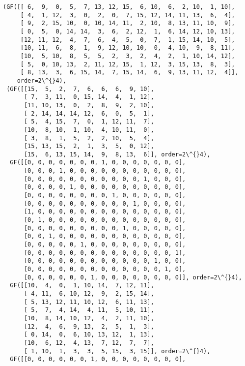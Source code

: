 \documentclass[11pt]{article}
\makeatletter
\newcommand{\boxspacing}{\kern\kvtcb@left@rule\kern\kvtcb@boxsep}
\newcommand{\prompt}[4]{
        {\ttfamily\llap{{\color{#2}[#3]:\hspace{3pt}#4}}\vspace{-\baselineskip}}
    }
\makeatother
\begin{document}
            \begin{tcolorbox}[breakable, size=fbox, boxrule=.5pt, pad at break*=1mm, opacityfill=0]
\prompt{Out}{outcolor}{3}{\boxspacing}
\begin{Verbatim}[commandchars=\\\{\}]
(GF([[ 6,  9,  0,  5,  7, 13, 12, 15,  6, 10,  6,  2, 10,  1, 10],
     [ 4,  1, 12,  3,  0,  2,  0,  7, 15, 12, 14, 11, 13,  6,  4],
     [ 9,  2, 15, 10,  0, 10, 14, 11,  2, 10,  8, 13, 11, 10,  9],
     [ 0,  5,  0, 14, 14,  3,  6,  2, 12,  1,  6, 14, 12, 10, 13],
     [12, 11, 12,  4,  7,  6,  4,  5,  0,  7,  1, 15, 14, 10,  5],
     [10, 11,  6,  8,  1,  9, 12, 10, 10,  0,  4, 10,  9,  8, 11],
     [10,  5, 10,  8,  5,  5,  2,  3,  2,  4,  2,  1, 10, 14, 12],
     [ 5,  0, 10, 13,  2, 11, 12, 15,  1, 12,  3, 15, 13,  8,  3],
     [ 8, 13,  3,  6, 15, 14,  7, 15, 14,  6,  9, 13, 11, 12,  4]],
    order=2\^{}4),
 (GF([[15,  5,  2,  7,  6,  6,  6,  9, 10],
      [ 7,  3, 11,  0, 15, 14,  4,  1, 12],
      [11, 10, 13,  0,  2,  8,  9,  2, 10],
      [ 2, 14, 14, 14, 12,  6,  0,  5,  1],
      [ 5,  4, 15,  7,  0,  1, 12, 11,  7],
      [10,  8, 10,  1, 10,  4, 10, 11,  0],
      [ 3,  8,  1,  5,  2,  2, 10,  5,  4],
      [15, 13, 15,  2,  1,  3,  5,  0, 12],
      [15,  6, 13, 15, 14,  9,  8, 13,  6]], order=2\^{}4),
  GF([[0, 0, 0, 0, 0, 0, 0, 1, 0, 0, 0, 0, 0, 0, 0],
      [0, 0, 0, 1, 0, 0, 0, 0, 0, 0, 0, 0, 0, 0, 0],
      [0, 0, 0, 0, 0, 0, 0, 0, 0, 0, 0, 1, 0, 0, 0],
      [0, 0, 0, 0, 1, 0, 0, 0, 0, 0, 0, 0, 0, 0, 0],
      [0, 0, 0, 0, 0, 0, 0, 0, 1, 0, 0, 0, 0, 0, 0],
      [0, 0, 0, 0, 0, 0, 0, 0, 0, 0, 1, 0, 0, 0, 0],
      [1, 0, 0, 0, 0, 0, 0, 0, 0, 0, 0, 0, 0, 0, 0],
      [0, 1, 0, 0, 0, 0, 0, 0, 0, 0, 0, 0, 0, 0, 0],
      [0, 0, 0, 0, 0, 0, 0, 0, 0, 1, 0, 0, 0, 0, 0],
      [0, 0, 1, 0, 0, 0, 0, 0, 0, 0, 0, 0, 0, 0, 0],
      [0, 0, 0, 0, 0, 1, 0, 0, 0, 0, 0, 0, 0, 0, 0],
      [0, 0, 0, 0, 0, 0, 0, 0, 0, 0, 0, 0, 0, 0, 1],
      [0, 0, 0, 0, 0, 0, 0, 0, 0, 0, 0, 0, 1, 0, 0],
      [0, 0, 0, 0, 0, 0, 0, 0, 0, 0, 0, 0, 0, 1, 0],
      [0, 0, 0, 0, 0, 0, 1, 0, 0, 0, 0, 0, 0, 0, 0]], order=2\^{}4),
  GF([[10,  4,  0,  1, 10, 14,  7, 12, 11],
      [ 4, 11,  6, 10, 12,  9,  2, 15, 14],
      [ 5, 13, 12, 11, 10, 12,  6, 11, 13],
      [ 5,  7,  4, 14,  4, 11,  5, 10, 11],
      [10,  8, 14, 10, 12,  4,  2, 11, 10],
      [12,  4,  6,  9, 13,  2,  5,  1,  3],
      [ 0, 14,  0,  6, 10, 13, 12,  1, 13],
      [10,  6, 12,  4, 13,  7, 12,  7,  7],
      [ 1, 10,  1,  3,  3,  5, 15,  3, 15]], order=2\^{}4),
  GF([[0, 0, 0, 0, 0, 0, 1, 0, 0, 0, 0, 0, 0, 0, 0],

\end{Verbatim}
\end{tcolorbox}
\end{document}
